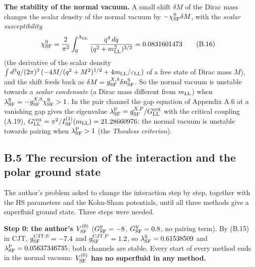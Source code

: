 \documentclass[
  10pt,
]{article}
\begin{document}
\textbf{The stability of the normal vacuum.} A small shift \(\delta M\)
of the Dirac mass changes the scalar density of the normal vacuum by
\(-\chi^{\rm S}_{\rm SF}\delta M\), with the \emph{scalar
susceptibility}
\[\chi^{\rm S}_{\rm SF}=\frac2{\pi^2}\int_0^{\Lambda_{\rm LL}}\frac{q^4\,dq}{(q^2+m_{\rm LL}^2)^{3/2}}=0.0831601473\tag{B.16}\]
(the derivative of the scalar density
\(\int d^3q/(2\pi)^3\,(-4M/(q^2+M^2)^{1/2}+4m_{\rm LL}/\varepsilon_{\rm LL})\)
of a free state of Dirac mass \(M\)), and the shift feeds back as
\(\delta M=g^{X,{\rm S}}_{\rm SF}\delta n^{\rm S}_{\rm SF}\). So the
normal vacuum is unstable towards a \emph{scalar condensate} (a Dirac
mass different from \(m_{\rm LL}\)) when
\(\lambda^{\rm S}_{\rm SF}=-g^{X,{\rm S}}_{\rm SF}\chi^{\rm S}_{\rm SF}>1\).
In the pair channel the gap equation of Appendix A.6 at a vanishing gap
gives the eigenvalue
\(\lambda^{\rm P}_{\rm SF}=g^{X,{\rm P}}_{\rm SF}/G^{\rm crit}_{\rm LL}\)
with the critical coupling (A.19),
\(G^{\rm crit}_{\rm LL}=\pi^2/I^{(1)}_{\rm SF}(m_{\rm LL})=21.28660976\):
the normal vacuum is unstable towards pairing when
\(\lambda^{\rm P}_{\rm SF}>1\) (the \emph{Thouless criterion}).

\hypertarget{b.5-the-recursion-of-the-interaction-and-the-polar-ground-state}{%
\subsection{B.5 The recursion of the interaction and the polar ground
state}\label{b.5-the-recursion-of-the-interaction-and-the-polar-ground-state}}

The author's problem asked to change the interaction step by step,
together with the HS parameters and the Kohn-Sham potentials, until all
three methods give a superfluid ground state. Three steps were needed.

\textbf{Step 0: the author's \(V^{(0)}_{\rm SF}\)}
(\(G^{\rm S}_{\rm SF}=-8\), \(G^{\rm V}_{\rm SF}=0.8\), no pairing
term). By (B.15) in CJT, \(g^{{\rm CJT},{\rm S}}_{\rm SF}=-7.4\) and
\(g^{{\rm CJT},{\rm P}}_{\rm SF}=1.2\), so
\(\lambda^{\rm S}_{\rm SF}=0.61538509\) and
\(\lambda^{\rm P}_{\rm SF}=0.05637346735\): both channels are stable.
Every start of every method ends in the normal vacuum:
\textbf{\(V^{(0)}_{\rm SF}\) has no superfluid in any method.}
\end{document}
